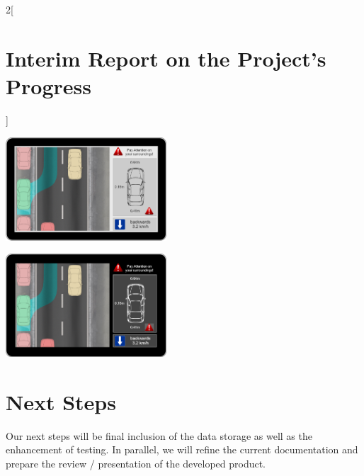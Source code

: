 \documentclass[12pt, a4paper, oneside, british]{report}
\begin{document}
\begin{multicols}{2}[\section{Interim Report on the Project's Progress}]
\vspace{0.5cm}

\includegraphics[width=0.45\textwidth]{brightskin.png}

\vspace{0.5cm}

\includegraphics[width=0.45\textwidth]{darkskin.png}

\section{Next Steps}
Our next steps will be final inclusion of the data storage as well as the enhancement of testing. In parallel, we will refine the current documentation and prepare the review / presentation of the developed product.


\end{multicols}
\end{document}
